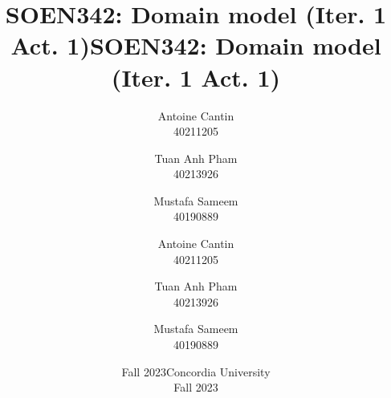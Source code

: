 \documentclass[a4paper]{article}
\title{SOEN342: Domain model (Iter. 1 Act. 1)}
\author{Antoine Cantin \\ 40211205 \and Tuan Anh Pham \\ 40213926  \and Mustafa Sameem \\40190889}
\date{Fall 2023}
\begin{document}
	
	\title{SOEN342: Domain model (Iter. 1 Act. 1)}
	
	\author{Antoine Cantin \\ 40211205 \and Tuan Anh Pham \\ 40213926  \and Mustafa Sameem \\40190889}
	
	\date{Concordia University \\ Fall 2023}
	
	\maketitle
	
	\vfill
	
	\clearpage
	
	\renewcommand {\umltextcolor}{umltext1}
	\renewcommand {\umlfillcolor}{umlfill1}
	\renewcommand {\umldrawcolor}{umldraw1}
	
\end{document}
